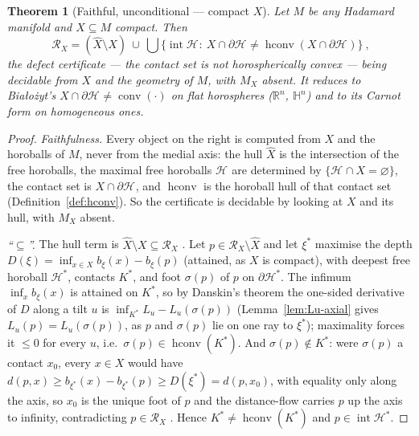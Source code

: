 \documentclass[11pt]{article}
\newtheorem{theorem}{Theorem}[section]
\theoremstyle{remark}
\newcommand{\R}{\mathbb{R}}
\newcommand{\X}{X}
\newcommand{\Xhat}{\widehat{\X}}
\newcommand{\Mx}{M_{\X}}
\newcommand{\Rx}{\mathcal{R}_{\X}}
\newcommand{\Hb}[1]{\mathcal{H}_{#1}}
\newcommand{\conv}{\operatorname{conv}}
\newcommand{\hconv}{\operatorname{hconv}}
\newcommand{\HH}{\mathbb{H}}
\begin{document}
\begin{theorem}[Faithful, unconditional --- compact $X$]
\label{thm:faithful}
Let $M$ be \emph{any} Hadamard manifold and $X\subseteq M$ compact.
Then
\[
  \boxed{\ \Rx=(\Xhat\setminus X)\ \cup\
  \bigcup\bigl\{\operatorname{int}\Hb{}:\ X\cap\partial\Hb{}\neq
  \hconv(X\cap\partial\Hb{})\bigr\}\ },
\]
the defect certificate --- the contact set is not horospherically
convex --- being decidable from $X$ and the geometry of $M$, with
$\Mx$ absent. It reduces to Bia\l{}o\.zyt's
$X\cap\partial\Hb{}\neq\conv(\cdot)$ on flat horospheres ($\R^{n}$,
$\HH^{n}$) and to its Carnot form on homogeneous ones.
\end{theorem}

\begin{proof}
\emph{Faithfulness.} Every object on the right is computed from $X$
and the horoballs of $M$, never from the medial axis: the hull
$\Xhat$ is the intersection of the free horoballs, the maximal free
horoballs $\Hb{}$ are determined by $\{\Hb{}\cap X=\varnothing\}$, the
contact set is $X\cap\partial\Hb{}$, and $\hconv$ is the horoball hull
of that contact set (Definition~\ref{def:hconv}). So the certificate
is decidable by looking at $X$ and its hull, with $\Mx$ absent.

\emph{``$\subseteq$''.} The hull term is $\Xhat\setminus X\subseteq\Rx$
\cite[Thm.~3.1]{R1}. Let $p\in\Rx\setminus\Xhat$ and let $\xi^{\ast}$
maximise the depth $D(\xi)=\inf_{x\in X}b_{\xi}(x)-b_{\xi}(p)$
(attained, as $X$ is compact), with deepest free horoball
$\Hb{}^{\ast}$, contacts $K^{\ast}$, and foot $\sigma(p)$ of $p$ on
$\partial\Hb{}^{\ast}$. The infimum $\inf_{x}b_{\xi}(x)$ is attained on
$K^{\ast}$, so by Danskin's theorem the one-sided derivative of $D$
along a tilt $u$ is $\inf_{K^{\ast}}L_{u}-L_{u}(\sigma(p))$
(Lemma~\ref{lem:Lu-axial} gives $L_{u}(p)=L_{u}(\sigma(p))$, as $p$ and
$\sigma(p)$ lie on one ray to $\xi^{\ast}$); maximality forces it
$\le0$ for every $u$, i.e.\ $\sigma(p)\in\hconv(K^{\ast})$. And
$\sigma(p)\notin K^{\ast}$: were $\sigma(p)$ a contact $x_{0}$, every
$x\in X$ would have $d(p,x)\ge b_{\xi^{\ast}}(x)-b_{\xi^{\ast}}(p)\ge
D(\xi^{\ast})=d(p,x_{0})$, with equality only along the axis, so
$x_{0}$ is the unique foot of $p$ and the distance-flow carries $p$ up
the axis to infinity, contradicting $p\in\Rx$ \cite{Lie}. Hence
$K^{\ast}\neq\hconv(K^{\ast})$ and $p\in\operatorname{int}\Hb{}^{\ast}$.


\end{proof}
\end{document}
